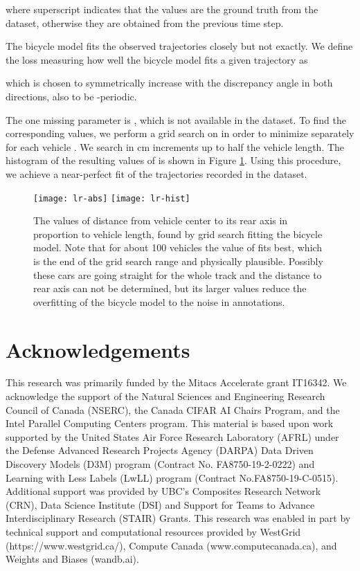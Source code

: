 \documentclass[letterpaper, 10 pt, conference]{ieeeconf}
\begin{document}
where  superscript indicates that the values are the ground truth from the dataset, otherwise they are obtained from the previous time step.

The bicycle model fits the observed trajectories closely but not exactly.
We define the loss measuring how well the bicycle model fits a given trajectory as

which is chosen to symmetrically increase with the discrepancy angle in both directions, also to be -periodic.

The one missing parameter is , which is not available in the dataset. To find the corresponding values, we perform a grid search on  in order to minimize  separately for each vehicle . We search in  cm increments up to half the vehicle length. The histogram of the resulting values of  is shown in Figure \ref{fig:lr-hist}. Using this procedure, we achieve a near-perfect fit of the trajectories recorded in the dataset.

\begin{figure}[t]
    \centering
    \texttt{[image: lr-abs]}
    \texttt{[image: lr-hist]}
    \caption{The values of distance from vehicle center to its rear axis in proportion to vehicle length, found by grid search fitting the bicycle model. Note that for about 100 vehicles the value of  fits best, which is the end of the grid search range and physically plausible. Possibly these cars are going straight for the whole track and the distance to rear axis can not be determined, but its larger values reduce the overfitting of the bicycle model to the noise in annotations.}
    \label{fig:lr-hist}
\end{figure}



\section*{Acknowledgements}

This research was primarily funded by the Mitacs Accelerate grant IT16342.
We acknowledge the support of the Natural Sciences and Engineering Research Council of Canada (NSERC), the Canada CIFAR AI Chairs Program, and the Intel Parallel Computing Centers program. This material is based upon work supported by the United States Air Force Research Laboratory (AFRL) under the Defense Advanced Research Projects Agency (DARPA) Data Driven Discovery Models (D3M) program (Contract No. FA8750-19-2-0222) and Learning with Less Labels (LwLL) program (Contract No.FA8750-19-C-0515). Additional support was provided by UBC's Composites Research Network (CRN), Data Science Institute (DSI) and Support for Teams to Advance Interdisciplinary Research (STAIR) Grants. This research was enabled in part by technical support and computational resources provided by WestGrid (https://www.westgrid.ca/), Compute Canada (www.computecanada.ca), and Weights and Biases (wandb.ai).
\end{document}
